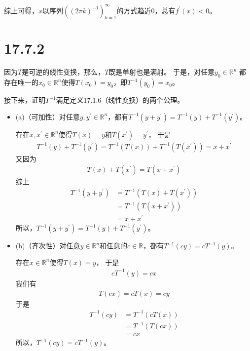 \documentclass{article}
\begin{document}
综上可得，$x$以序列$((2\pi k)^{-1})_{k = 1}^\infty$的方式趋近$0$，总有$f^\prime(x) < 0$。

\section*{17.7.2}

因为$T$是可逆的线性变换，那么，$T$既是单射也是满射。
于是，对任意$y_0 \in \mathbb{R}^n$
都存在唯一的$x_0 \in \mathbb{R}^n$使得$T(x_0) = y_0$，即$T^{-1}(y_0) = x_0$。

接下来，证明$T^{-1}$满足定义17.1.6（线性变换）的两个公理。
\begin{itemize}
  \item (a)（可加性）对任意$y, y^\prime \in \mathbb{R}^n$，都有$T^{-1}(y + y^\prime) = T^{-1}(y) + T^{-1}(y^\prime)$。

        存在$x, x^\prime \in \mathbb{R}^n$使得$T(x) = y$和$T(x^\prime) = y^\prime$，
        于是
        \begin{align*}
          T^{-1}(y) + T^{-1}(y^\prime) = T^{-1}(T(x)) + T^{-1}(T(x^\prime)) = x + x^\prime
        \end{align*}
        又因为
        \begin{align*}
          T(x) + T(x^\prime) = T(x + x^\prime)
        \end{align*}
        综上
        \begin{align*}
          T^{-1}(y + y^\prime)
           & = T^{-1}(T(x) + T(x^\prime)) \\
           & = T^{-1}(T(x + x^\prime))    \\
           & = x + x^\prime
        \end{align*}
        所以，$T^{-1}(y + y^\prime) = T^{-1}(y) + T^{-1}(y^\prime)$。

  \item (b)（齐次性）对任意$y \in \mathbb{R}^n$和任意的$c \in \mathbb{R}$，都有$T^{-1}(cy) = cT^{-1}(y)$。

        存在$x \in \mathbb{R}^n$使得$T(x) = y$，
        于是
        \begin{align*}
          cT^{-1}(y) = cx
        \end{align*}
        我们有
        \begin{align*}
          T(cx) = cT(x) = cy
        \end{align*}
        于是
        \begin{align*}
          T^{-1}(cy) & = T^{-1}(cT(x)) \\
                     & = T^{-1}(T(cx)) \\
                     & = cx
        \end{align*}
        所以，$T^{-1}(cy) = cT^{-1}(y)$。

\end{itemize}
\end{document}
